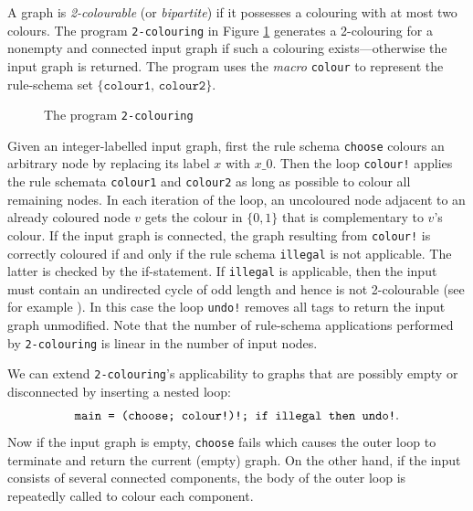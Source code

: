 \begin{example}[2-Colouring]
\label{ex:2-colouring}
A graph is \emph{2-colourable} (or \emph{bipartite}) if it possesses a colouring with at most two colours. The program \texttt{2-colouring} in Figure \ref{fig:2colouring} generates a 2-colouring for a nonempty and connected input graph if such a colouring exists---otherwise the input graph is returned. The program uses the \emph{macro} \texttt{colour} to represent the rule-schema set $\mathtt{\{colour1,\, colour2\}}$. 

\begin{figure}[htb]
 \begin{center}
  
 \end{center}
\caption{The program \texttt{2-colouring}}\label{fig:2colouring}
\end{figure}

Given an integer-labelled input graph, first the rule schema \texttt{choose} colours an arbitrary node by replacing its label $x$ with $x\_0$. Then the loop \texttt{colour!} applies the rule schemata \texttt{colour1} and \texttt{colour2} as long as possible to colour all remaining nodes. In each iteration of the loop, an uncoloured node adjacent to an already coloured node $v$ gets the colour in $\{0,1\}$ that is complementary to $v$'s colour. If the input graph is connected, the graph resulting from \texttt{colour!} is correctly coloured if and only if the rule schema \texttt{illegal} is not applicable.  The latter is checked by the if-statement. If \texttt{illegal} is applicable, then the input must contain an undirected cycle of odd length and hence is not 2-colourable (see for example \cite{Kleinberg-Tardos06a}). In this case the loop \texttt{undo!} removes all tags to return the input graph unmodified. Note that the number of rule-schema applications performed by \texttt{2-colouring} is linear in the number of input nodes.

We can extend \texttt{2-colouring}'s applicability to graphs that are possibly empty or disconnected by inserting a nested loop: 
\[ \text{\texttt{main = (choose; colour!)!; if illegal then undo!}.} \]
Now if the input graph is empty, \texttt{choose} fails which causes the outer loop to terminate and return the current (empty) graph. On the other hand, if the input consists of several connected components, the body of the outer loop is repeatedly called to colour each component. 
\end{example}


